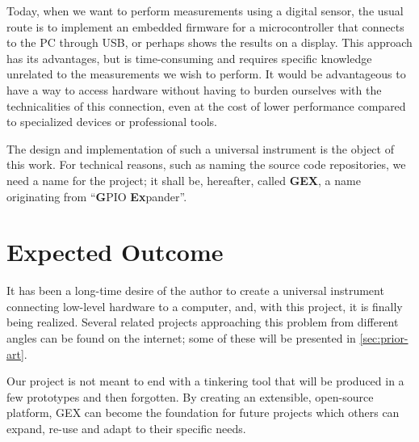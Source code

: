 Today, when we want to perform measurements using a digital sensor, the usual route is to implement an embedded firmware for a microcontroller that connects to the \gls{PC} through \gls{USB}, or perhaps shows the results on a display. This approach has its advantages, but is time-consuming and requires specific knowledge unrelated to the measurements we wish to perform. It would be advantageous to have a way to access hardware without having to burden ourselves with the technicalities of this connection, even at the cost of lower performance compared to specialized devices or professional tools.

The design and implementation of such a universal instrument is the object of this work. For technical reasons, such as naming the source code repositories, we need a name for the project; it shall be, hereafter, called \textbf{GEX}, a name originating from ``\textbf{G}PIO \textbf{Ex}pander''.

\section{Expected Outcome}\label{sec:expected-outcome}

It has been a long-time desire of the author to create a universal instrument connecting low-level hardware to a computer, and, with this project, it is finally being realized. Several related projects approaching this problem from different angles can be found on the internet; some of these will be presented in \cref{sec:prior-art}. 

Our project is not meant to end with a tinkering tool that will be produced in a few prototypes and then forgotten. By creating an extensible, open-source platform, GEX can become the foundation for future projects which others can expand, re-use and adapt to their specific needs.

